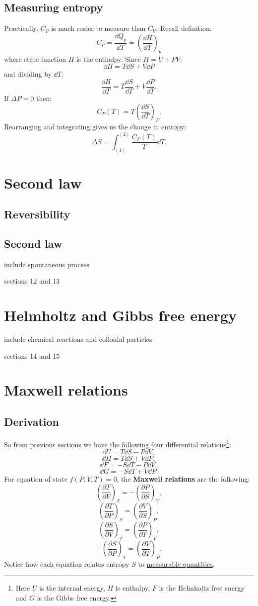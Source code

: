 \documentclass{article}
\begin{document}
\subsection{Measuring entropy}
Practically, $C_P$ is much easier to measure than $C_V$. Recall definition:
$$C_P=\frac{\dd Q_p}{\dd T}=\left(\frac{\dd H}{\dd T}\right)_p$$
where state function $H$ is the enthalpy. Since $H=U+PV$:
$$\dd H=T\dd S+V\dd P$$
and dividing by $\dd T$:
$$\frac{\dd H}{\dd T}=T\frac{\dd S}{\dd T}+V\frac{\dd P}{\dd T}.$$
If $\Delta P=0$ then:
$$C_P(T)=T\left(\frac{\dd S}{\dd T}\right)_P.$$
Rearranging and integrating gives us the change in entropy:
$$\Delta S=\int_{(1)}^{(2)}\frac{C_P(T)}{T}\dd T.$$

\newpage

\section{Second law}

\subsection{Reversibility}

\subsection{Second law}
include spontaneous process

sections 12 and 13

\newpage

\section{Helmholtz and Gibbs free energy}
include chemical reactions and colloidal particles

sections 14 and 15


\newpage
    

\section{Maxwell relations}

\subsection{Derivation}
So from previous sections we have the following four differential relations\footnote{Here $U$ is the internal energy, $H$ is enthalpy, $F$ is the Helmholtz free energy and $G$ is the Gibbs free energy.}:
$$\dd U=T\dd S-P\dd V,$$
$$\dd H=T\dd S+V\dd P,$$
$$\dd F=-S\dd T-P\dd V,$$
$$\dd G=-S\dd T+V\dd P.$$
For equation of state $f(P,V,T)=0$, the \textbf{Maxwell relations} are the following:
$$\left(\frac{\partial T}{\partial V}\right)_S=-\left(\frac{\partial P}{\partial S}\right)_V,$$
$$\left(\frac{\partial T}{\partial P}\right)_S=\left(\frac{\partial V}{\partial S}\right)_P,$$
$$\left(\frac{\partial S}{\partial V}\right)_T=\left(\frac{\partial P}{\partial T}\right)_V,$$
$$-\left(\frac{\partial S}{\partial P}\right)_T=\left(\frac{\partial V}{\partial T}\right)_P.$$
Notice how each equation relates entropy $S$ to \underline{measurable quantities}.
\end{document}
